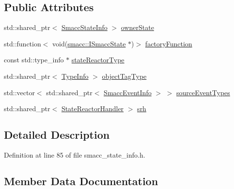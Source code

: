 \subsection*{Public Attributes}
\begin{DoxyCompactItemize}
\item 
std\+::shared\+\_\+ptr$<$ \hyperlink{classsmacc_1_1introspection_1_1SmaccStateInfo}{Smacc\+State\+Info} $>$ \hyperlink{structsmacc_1_1introspection_1_1SmaccStateReactorInfo_a7f79a42095ce284939ca47fb25a14101}{owner\+State}
\item 
std\+::function$<$ void(\hyperlink{classsmacc_1_1ISmaccState}{smacc\+::\+I\+Smacc\+State} $\ast$)$>$ \hyperlink{structsmacc_1_1introspection_1_1SmaccStateReactorInfo_a07d93f820f191aa3f9811fc2e1792b7a}{factory\+Function}
\item 
const std\+::type\+\_\+info $\ast$ \hyperlink{structsmacc_1_1introspection_1_1SmaccStateReactorInfo_a02de210fcdffd81424537d4d8a330609}{state\+Reactor\+Type}
\item 
std\+::shared\+\_\+ptr$<$ \hyperlink{classsmacc_1_1introspection_1_1TypeInfo}{Type\+Info} $>$ \hyperlink{structsmacc_1_1introspection_1_1SmaccStateReactorInfo_ae76d3acd0f68e75051ed002f10539738}{object\+Tag\+Type}
\item 
std\+::vector$<$ std\+::shared\+\_\+ptr$<$ \hyperlink{structsmacc_1_1introspection_1_1SmaccEventInfo}{Smacc\+Event\+Info} $>$ $>$ \hyperlink{structsmacc_1_1introspection_1_1SmaccStateReactorInfo_a66cb20b15e0ad0fbfd5ad20b83462eb6}{source\+Event\+Types}
\item 
std\+::shared\+\_\+ptr$<$ \hyperlink{classsmacc_1_1introspection_1_1StateReactorHandler}{State\+Reactor\+Handler} $>$ \hyperlink{structsmacc_1_1introspection_1_1SmaccStateReactorInfo_a0d28653e507c3f4498475987d5916f76}{srh}
\end{DoxyCompactItemize}


\subsection{Detailed Description}


Definition at line 85 of file smacc\+\_\+state\+\_\+info.\+h.



\subsection{Member Data Documentation}
\mbox{\label{structsmacc_1_1introspection_1_1SmaccStateReactorInfo_a07d93f820f191aa3f9811fc2e1792b7a}} 
